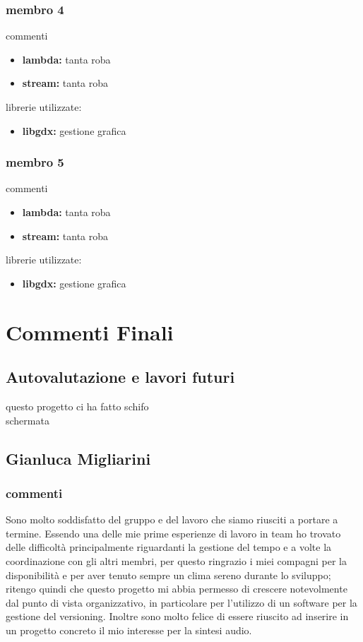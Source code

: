 \documentclass[a4paper,12pt]{report}
\begin{document}
\subsection{membro 4}
commenti
\begin{itemize}
	\item \textbf{lambda:} tanta roba
	\item \textbf{stream:} tanta roba
\end{itemize}
librerie utilizzate:
\begin{itemize}
	\item \textbf{libgdx:} gestione grafica
\end{itemize}
\newpage

\subsection{membro 5}
commenti
\begin{itemize}
	\item \textbf{lambda:} tanta roba
	\item \textbf{stream:} tanta roba
\end{itemize}
librerie utilizzate:
\begin{itemize}
	\item \textbf{libgdx:} gestione grafica
\end{itemize}
\newpage




\chapter{Commenti Finali}
\section{Autovalutazione e lavori futuri}
questo progetto ci ha fatto schifo \\
schermata 
\newpage

\section{Gianluca Migliarini}
\subsection{commenti}
Sono molto soddisfatto del gruppo e del lavoro che siamo riusciti a portare a termine.
Essendo una delle mie prime esperienze di lavoro in team ho trovato delle difficoltà principalmente riguardanti
la gestione del tempo e a volte la coordinazione con gli altri membri, per questo ringrazio i miei compagni per la disponibilità e per aver tenuto sempre un clima sereno durante lo sviluppo; ritengo quindi che questo progetto mi abbia permesso di crescere notevolmente dal punto di vista organizzativo, in particolare per l'utilizzo di un software per la gestione del versioning.
Inoltre sono molto felice di essere riuscito ad inserire in un progetto concreto il mio interesse per la sintesi audio.
\end{document}
